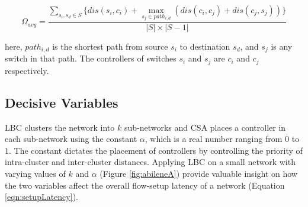 \documentclass[preprint,12pt]{elsarticle}
\begin{document}
	\begin{equation} \label{eqn:setupLatency}
	\Omega_{avg} = \frac{\sum_{s_i,s_d\in S} \{dis(s_i,c_i)+\max_{s_j\in path_{i,d}}\left(dis(c_i,c_j)+dis(c_j,s_j) \right) \}}{|S|\times |S-1|}
	\end{equation}
	
	here, $path_{i,d}$ is the shortest path from source $s_i$ to destination $s_d$, and $s_j$ is any switch in that path. The controllers of switches $s_i$ and $s_j$ are $c_i$ and $c_j$ respectively.
	
	
	
	\subsection{Decisive Variables} \label{optimumK}
	LBC clusters the network into $k$ sub-networks and CSA places a controller in each sub-network using the constant $\alpha$, which is a real number ranging from $0$ to $1$. The constant dictates the placement of controllers by controlling the priority of intra-cluster and inter-cluster distances. Applying LBC on a small network with varying values of $k$ and $\alpha$ (Figure \ref{fig:abileneA}) provide valuable insight on how the two variables affect the overall flow-setup latency of a network (Equation \ref{eqn:setupLatency}).
	
\end{document}
